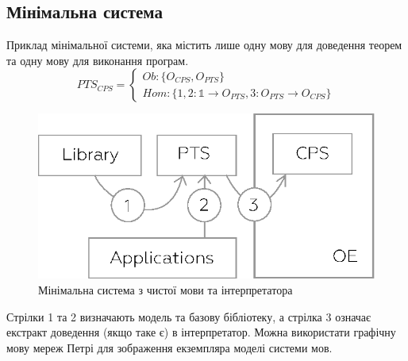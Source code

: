 \subsection{Мінімальна система}
Приклад мінімальної системи, яка містить лише одну мову для доведення теорем
та одну мову для виконання програм.
\begin{equation}
PTS_{CPS} =
\begin{cases}
Ob: \{ O_{CPS}, O_{PTS} \} \\
Hom: \{ 1,2: \mathbb{1} \rightarrow O_{PTS}, 3: O_{PTS} \rightarrow O_{CPS} \}
\end{cases}
\end{equation}
\begin{center}
\begin{figure}[ht]
  \centerline{\includegraphics[scale=0.6]{minimal.eps}}
  \caption{Мінімальна система з чистої мови та інтерпретатора}
\end{figure}
\end{center}
Стрілки 1 та 2 визначають
модель та базову бібліотеку, а стрілка 3 означає екстракт
доведення (якщо таке є) в інтерпретатор. Можна використати графічну
мову мереж Петрі для зображення екземпляра моделі системи мов.

\newpage
